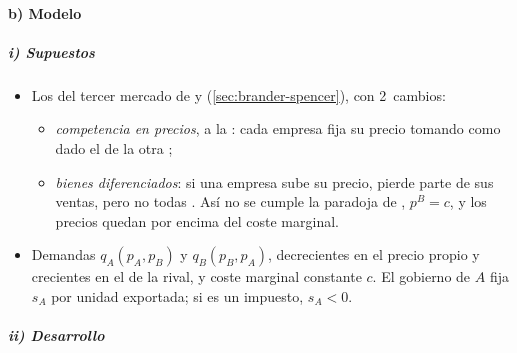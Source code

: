 \documentclass[11pt]{article}
\begin{document}
\paragraph{b) Modelo}

\subparagraph{i) Supuestos}

\begin{itemize}
\item Los del tercer mercado de  y  (\ref{sec:brander-spencer}), con 2~cambios:
  \begin{itemize}
  \item \emph{competencia en precios}, a la : cada empresa fija su precio tomando como dado el de la otra ;
  \item \emph{bienes diferenciados}: si una empresa sube su precio, pierde parte de sus ventas, pero no todas . Así no se cumple la paradoja de , $p^B=c$, y los precios quedan por encima del coste marginal.
  \end{itemize}
\item Demandas $q_A(p_A,p_B)$ y $q_B(p_B,p_A)$, decrecientes en el precio propio y crecientes en el de la rival, y coste marginal constante $c$. El gobierno de $A$ fija $s_A$ por unidad exportada; si es un impuesto, $s_A<0$.
\end{itemize}

\subparagraph{ii) Desarrollo}
\end{document}
